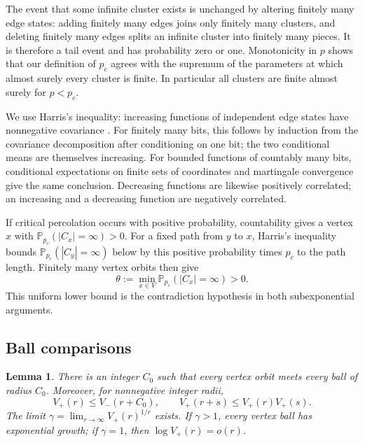 \documentclass[11pt]{article}
\newtheorem{lemma}[theorem]{Lemma}
\theoremstyle{definition}
\newcommand{\PP}{\mathbb P}
\newcommand{\pc}{p_c}
\begin{document}
The event that some infinite cluster exists is unchanged by altering
finitely many edge states: adding finitely many edges joins only
finitely many clusters, and deleting finitely many edges splits an
infinite cluster into finitely many pieces. It is therefore a tail
event and has probability zero or one. Monotonicity in $p$ shows that
our definition of $\pc$ agrees with the supremum of the parameters
at which almost surely every cluster is finite. In particular all
clusters are finite almost surely for $p<\pc$.

We use Harris's inequality: increasing functions of independent
edge states have nonnegative covariance \cite{Harris1960}.
For finitely many bits, this follows by induction from the covariance
decomposition after conditioning on one bit; the two conditional
means are themselves increasing. For bounded functions of countably
many bits, conditional expectations on finite sets of coordinates
and martingale convergence give the same conclusion. Decreasing
functions are likewise positively correlated; an increasing and a
decreasing function are negatively correlated.

If critical percolation occurs with positive probability, countability
gives a vertex $x$ with $\PP_{\pc}(|C_x|=\infty)>0$.
For a fixed path from $y$ to $x$, Harris's inequality bounds
$\PP_{\pc}(|C_y|=\infty)$ below by this positive probability times
$\pc$ to the path length. Finitely many vertex orbits then give
\begin{equation}
\label{eq:uniform-jump}
 \theta:=\min_{x\in V}\PP_{\pc}(|C_x|=\infty)>0.
\end{equation}
This uniform lower bound is the contradiction hypothesis in both
subexponential arguments.

\subsection{Ball comparisons}

\begin{lemma}
\label{lem:orbit-growth}
There is an integer $C_0$ such that every vertex orbit meets every
ball of radius $C_0$. Moreover, for nonnegative integer radii,
\begin{equation}
\label{eq:ball-comparisons}
 V_+(r)\le V_-(r+C_0),\qquad
 V_+(r+s)\le V_+(r)V_+(s).
\end{equation}
The limit $\gamma=\lim_{r\to\infty}V_+(r)^{1/r}$ exists. If
$\gamma>1$, every vertex ball has exponential growth; if $\gamma=1$,
then $\log V_+(r)=o(r)$.
\end{lemma}
\end{document}
